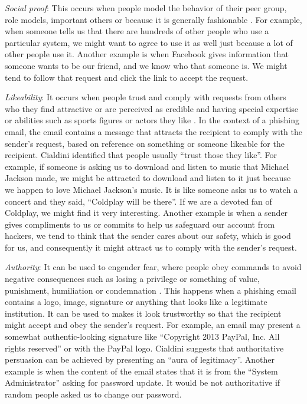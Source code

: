 \emph{Social proof}: This occurs when people model the behavior of
their peer group, role models, important others or because it is generally
\textquotedbl{}fashionable\textquotedbl{} \cite{workman:2008}. For
example, when someone tells us that there are hundreds of other people
who use a particular system, we might want to agree to use it as well
just because a lot of other people use it. Another example is when
Facebook gives information that someone wants to be our friend, and
we know who that someone is. We might tend to follow that request
and click the link to accept the request. 

\emph{Likeability}: It occurs when people trust and comply with requests
from others who they find attractive or are perceived as credible
and having special expertise or abilities such as sports figures or
actors they like \cite{workman:2008}. In the context of a phishing
email, the email contains a message that attracts the recipient to
comply with the sender's request, based on reference on something
or someone likeable for the recipient. Cialdini \cite{cialdini:2001}
identified that people usually \textquotedblleft trust those they
like\textquotedblright . For example, if someone is asking us to download
and listen to music that Michael Jackson made, we might be attracted
to download and listen to it just because we happen to love Michael
Jackson's music. It is like someone asks us to watch a concert and
they said, \textquotedblleft Coldplay will be there\textquotedblright .
If we are a devoted fan of Coldplay, we might find it very interesting.
Another example is when a sender gives compliments to us or commits
to help us safeguard our account from hackers, we tend to think that
the sender cares about our safety, which is good for us, and consequently
it might attract us to comply with the sender's request. 

\emph{Authority}: It can be used to engender fear, where people obey
commands to avoid negative consequences such as losing a privilege
or something of value, punishment, humiliation or condemnation \cite{workman:2008}.
This happens when a phishing email contains a logo, image, signature
or anything that looks like a legitimate institution. It can be used
to makes it look trustworthy so that the recipient might accept and
obey the sender's request. For example, an email may present a somewhat
authentic-looking signature like \textquotedblleft Copyright 2013
PayPal, Inc. All rights reserved\textquotedblright{} or with the PayPal
logo. Cialdini \cite{cialdini:2001} suggests that authoritative persuasion
can be achieved by presenting an \textquotedblleft aura of legitimacy\textquotedblright .
Another example is when the content of the email states that it is
from the \textquotedblleft System Administrator\textquotedblright{}
asking for password update. It would be not authoritative if random
people asked us to change our password.

